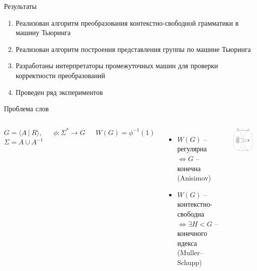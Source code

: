 \documentclass[xcolor=table]{beamer}
\begin{document}
\begin{frame}[fragile]{Результаты}
    \begin{enumerate}
    \item Реализован алгоритм преобразования контекстно-свободной грамматики в машину Тьюринга
    \item Реализован алгоритм построения представления группы по машине Тьюринга
    \item Разработаны интерпретаторы промежуточных машин для проверки корректности преобразований
    \item Проведен ряд экспериментов
\end{enumerate}
\end{frame}

\begin{frame}[noframenumbering]{Проблема слов}
    \begin{columns}[onlytextwidth,T]
        \column{\dimexpr\linewidth-60mm-5mm}
        $G = \langle A~|~R \rangle$, $\Sigma = A \cup A^{-1}$
        
        $\phi : \Sigma^* \to G$
        
        $W(G) = \phi^{-1}(1)$
        \newline
        \newline
        \begin{itemize}
            \item $W(G)$ -- регулярна $\iff G$ -- конечна (Anisimov)
            \item $W(G)$ -- контекстно-свободна $\iff \exists H < G$ -- конечного идекса (Muller–Schupp)
        \end{itemize}
        
        \column{60mm}
        \includegraphics[width=60mm]{pictures/3.png}
    \end{columns}
\end{frame}
\end{document}
